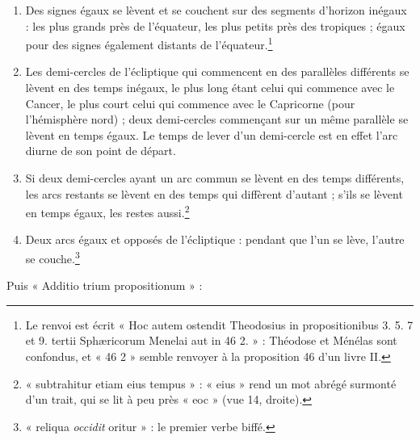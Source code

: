 \documentclass[11pt,a4paper]{article}
\begin{document}
\begin{enumerate}
  \item[10.] Des signes égaux se lèvent et se couchent sur des segments
    d'horizon inégaux : les plus grands près de l'équateur, les plus petits
    près des tropiques ; égaux pour des signes également distants de
    l'équateur.\footnote{Le renvoi est écrit « Hoc autem ostendit Theodosius in
    propositionibus 3. 5. 7 et 9. tertii Sphæricorum Menelai aut in 46 2. » :
    Théodose et Ménélas sont confondus, et « 46 2 » semble renvoyer à la
    proposition 46 d'un livre II.}
  \item[11.] Les demi-cercles de l'écliptique qui commencent en des parallèles
    différents se lèvent en des temps inégaux, le plus long étant celui qui
    commence avec le Cancer, le plus court celui qui commence avec le
    Capricorne (pour l'hémisphère nord) ; deux demi-cercles commençant sur un
    même parallèle se lèvent en temps égaux. Le temps de lever d'un demi-cercle
    est en effet l'arc diurne de son point de départ.
  \item[12.] Si deux demi-cercles ayant un arc commun se lèvent en des temps
    différents, les arcs restants se lèvent en des temps qui diffèrent d'autant ;
    s'ils se lèvent en temps égaux, les restes aussi.\footnote{« subtrahitur etiam
    eius tempus » : « eius » rend un mot abrégé surmonté d'un trait, qui se lit
    à peu près « eoc » (vue 14, droite).}
  \item[13.] Deux arcs égaux et opposés de l'écliptique : pendant que l'un se
    lève, l'autre se couche.\footnote{« reliqua \emph{occidit} oritur » : le
    premier verbe biffé.}
\end{enumerate}

Puis « Additio trium propositionum » :
\end{document}
